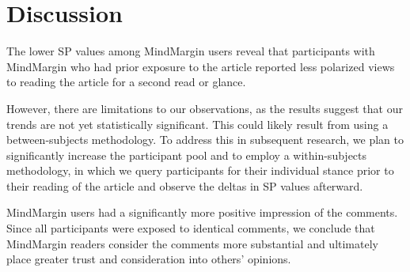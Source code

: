 \section{Discussion}



The lower SP values among MindMargin users reveal that participants with MindMargin who had prior exposure to the article reported less polarized views to reading the article for a second read or glance. 

However, there are limitations to our observations, as the results suggest that our trends are not yet statistically significant. This could likely result from using a between-subjects methodology. To address this in subsequent research, we plan to significantly increase the participant pool and to employ a within-subjects methodology, in which we query participants for their individual stance prior to their reading of the article and observe the deltas in SP values afterward. 

MindMargin users had a significantly more positive impression of the comments. Since all participants were exposed to identical comments, we conclude that MindMargin readers consider the comments more substantial and ultimately place greater trust and consideration into others' opinions.

